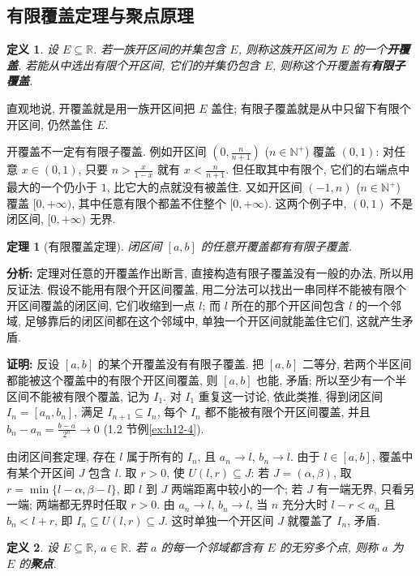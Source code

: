\documentclass[UTF8,openany]{ctexbook}
\theoremstyle{chinesetextbook}
\newtheorem{definition}{定义}[section]
\newtheorem{theorem}{定理}[section]
\newenvironment{cnproof}{\par\indent\textbf{证明:} \ignorespaces}{\par}
\begin{document}
\subsection{有限覆盖定理与聚点原理}
\begin{definition}
设 $E\subseteq\mathbb R$. 若一族开区间的并集包含 $E$, 则称这族开区间为 $E$ 的一个\textbf{开覆盖}. 若能从中选出有限个开区间, 它们的并集仍包含 $E$, 则称这个开覆盖有\textbf{有限子覆盖}.
\end{definition}
直观地说, 开覆盖就是用一族开区间把 $E$ 盖住; 有限子覆盖就是从中只留下有限个开区间, 仍然盖住 $E$.

开覆盖不一定有有限子覆盖. 例如开区间 $\displaystyle\left(0,\frac n{n+1}\right)$ ($n\in\mathbb N^+$) 覆盖 $(0,1)$: 对任意 $x\in(0,1)$, 只要 $\displaystyle n>\frac x{1-x}$ 就有 $\displaystyle x<\frac n{n+1}$. 但任取其中有限个, 它们的右端点中最大的一个仍小于 $1$, 比它大的点就没有被盖住. 又如开区间 $(-1,n)$ ($n\in\mathbb N^+$) 覆盖 $[0,+\infty)$, 其中任意有限个都盖不住整个 $[0,+\infty)$. 这两个例子中, $(0,1)$ 不是闭区间, $[0,+\infty)$ 无界.
\begin{theorem}[有限覆盖定理]
闭区间 $[a,b]$ 的任意开覆盖都有有限子覆盖.
\end{theorem}
\par\indent\textbf{分析:} 定理对任意的开覆盖作出断言, 直接构造有限子覆盖没有一般的办法, 所以用反证法. 假设不能用有限个开区间覆盖, 用二分法可以找出一串同样不能被有限个开区间覆盖的闭区间, 它们收缩到一点 $l$; 而 $l$ 所在的那个开区间包含 $l$ 的一个邻域, 足够靠后的闭区间都在这个邻域中, 单独一个开区间就能盖住它们, 这就产生矛盾.
\begin{cnproof}
反设 $[a,b]$ 的某个开覆盖没有有限子覆盖. 把 $[a,b]$ 二等分, 若两个半区间都能被这个覆盖中的有限个开区间覆盖, 则 $[a,b]$ 也能, 矛盾; 所以至少有一个半区间不能被有限个覆盖, 记为 $I_1$. 对 $I_1$ 重复这一讨论, 依此类推, 得到闭区间 $I_n=[a_n,b_n]$, 满足 $I_{n+1}\subseteq I_n$, 每个 $I_n$ 都不能被有限个开区间覆盖, 并且 $\displaystyle b_n-a_n=\frac{b-a}{2^n}\to0$ (1.2 节例\ref{ex:h12-4}).

由闭区间套定理, 存在 $l$ 属于所有的 $I_n$, 且 $a_n\to l$, $b_n\to l$. 由于 $l\in[a,b]$, 覆盖中有某个开区间 $J$ 包含 $l$. 取 $r>0$, 使 $U(l,r)\subseteq J$: 若 $J=(\alpha,\beta)$, 取 $r=\min\{l-\alpha,\beta-l\}$, 即 $l$ 到 $J$ 两端距离中较小的一个; 若 $J$ 有一端无界, 只看另一端; 两端都无界时任取 $r>0$. 由 $a_n\to l$, $b_n\to l$, 当 $n$ 充分大时 $l-r<a_n$ 且 $b_n<l+r$, 即 $I_n\subseteq U(l,r)\subseteq J$. 这时单独一个开区间 $J$ 就覆盖了 $I_n$, 矛盾.
\end{cnproof}
\begin{definition}
设 $E\subseteq\mathbb R$, $a\in\mathbb R$. 若 $a$ 的每一个邻域都含有 $E$ 的无穷多个点, 则称 $a$ 为 $E$ 的\textbf{聚点}.
\end{definition}
\end{document}
